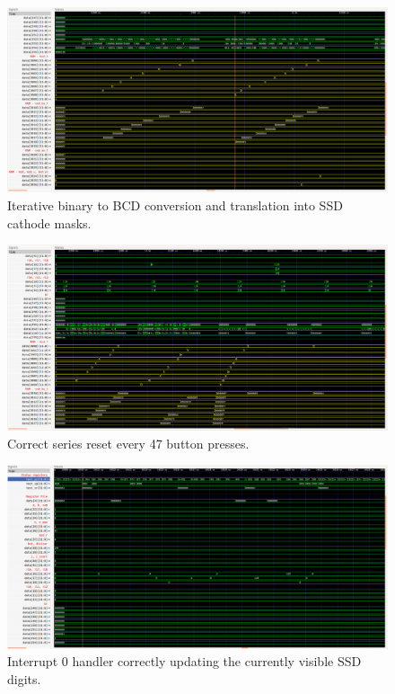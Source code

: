 \documentclass[12pt,a4paper]{article}
\begin{document}
\begin{figure}[H]
  \centering
  \includegraphics[width=7.2in]{assets/t2.png}
  \caption{Iterative binary to BCD conversion and translation into SSD
    cathode masks.}
\end{figure}

\begin{figure}[H]
  \centering
  \includegraphics[width=7.2in]{assets/t3.png}
  \caption{Correct series reset every 47 button presses.}
\end{figure}

\begin{figure}[H]
  \centering
  \includegraphics[width=7.2in]{assets/t4.png}
  \caption{Interrupt 0 handler correctly updating the currently
    visible SSD digits.}
\end{figure}
\end{document}
